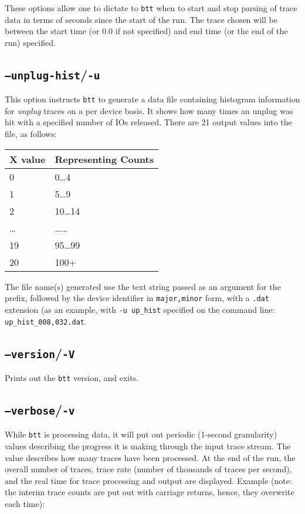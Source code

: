 \documentclass{article}
\begin{document}
  These options allow one to dictate to \texttt{btt} when to start and stop
  parsing of trace data in terms of seconds since the start of the run. The
  trace chosen will be between the start time (or 0.0 if not
  specified) and end time (or the end of the run) specified. 

\subsection{\label{sec:o-u}\texttt{--unplug-hist}/\texttt{-u}}

  This option instructs \texttt{btt} to generate a data file containing
  histogram information for \emph{unplug} traces on a per device
  basis. It shows how many times an unplug was hit with a specified
  number of IOs released. There are 21 output values into the file, as
  follows:

  \medskip
  \begin{tabular}{ll}
\textbf{X value} & \textbf{Representing Counts} \\\hline
0 & 0\dots\/4 \\
1 & 5\dots\/9 \\
2 & 10\dots\/14 \\
\dots & \dots\dots\\
19 & 95\dots\/99 \\
20 & 100+ \\
  \end{tabular}

  \medskip
  The file name(s) generated use the text string passed as an argument for
  the prefix, followed by the device identifier in \texttt{major,minor}
  form, with a \texttt{.dat} extension (as an example, with \texttt{-u
  up\_hist} specified on the command line: \texttt{up\_hist\_008,032.dat}.

\subsection{\label{sec:o-V}\texttt{--version}/\texttt{-V}}

  Prints out the \texttt{btt} version, and exits.

\subsection{\label{sec:o-v}\texttt{--verbose}/\texttt{-v}}

  While \texttt{btt} is processing data, it will put out periodic (1-second
  granularity) values describing the progress it is making through the
  input trace stream. The value describes how many traces have been
  processed. At the end of the run, the overall number of traces, trace
  rate (number of thousands of traces per second), and the real time for
  trace processing and output are displayed. Example (note: the interim
  trace counts are put out with carriage returns, hence, they overwrite
  each time):
\end{document}
